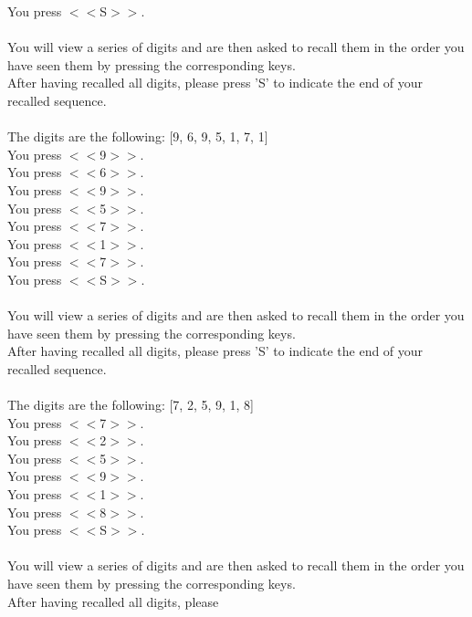\documentclass[pdflatex,sn-nature]{sn-jnl}%
\theoremstyle{thmstyleone}%
\theoremstyle{thmstyletwo}%
\theoremstyle{thmstylethree}%
\begin{document}
You press $<<$S$>>$.  $~$\\ 
 $~$\\ 
You will view a series of digits and are then asked to recall them in the order you have seen them by pressing the corresponding keys. $~$\\ 
After having recalled all digits, please press 'S' to indicate the end of your recalled sequence. $~$\\ 
 $~$\\ 
The digits are the following: [9, 6, 9, 5, 1, 7, 1] $~$\\ 
You press $<<$9$>>$. $~$\\ 
You press $<<$6$>>$. $~$\\ 
You press $<<$9$>>$. $~$\\ 
You press $<<$5$>>$. $~$\\ 
You press $<<$7$>>$. $~$\\ 
You press $<<$1$>>$. $~$\\ 
You press $<<$7$>>$. $~$\\ 
You press $<<$S$>>$.  $~$\\ 
 $~$\\ 
You will view a series of digits and are then asked to recall them in the order you have seen them by pressing the corresponding keys. $~$\\ 
After having recalled all digits, please press 'S' to indicate the end of your recalled sequence. $~$\\ 
 $~$\\ 
The digits are the following: [7, 2, 5, 9, 1, 8] $~$\\ 
You press $<<$7$>>$. $~$\\ 
You press $<<$2$>>$. $~$\\ 
You press $<<$5$>>$. $~$\\ 
You press $<<$9$>>$. $~$\\ 
You press $<<$1$>>$. $~$\\ 
You press $<<$8$>>$. $~$\\ 
You press $<<$S$>>$.  $~$\\ 
 $~$\\ 
You will view a series of digits and are then asked to recall them in the order you have seen them by pressing the corresponding keys. $~$\\ 
After having recalled all digits, please 
\end{document}
